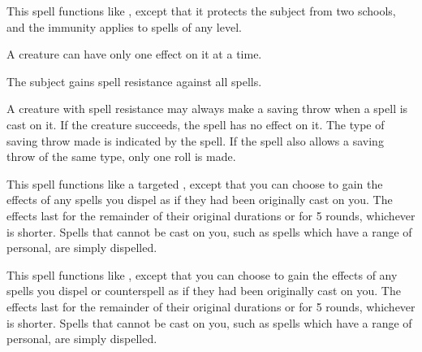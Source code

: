 \begin{spelleffect}
  This spell functions like , except that it protects the subject from two schools, and the immunity applies to spells of any level.
\end{spelleffect}
\begin{spellnotes}
  A creature can have only one  effect on it at a time.
\end{spellnotes}

\spellrng{\rngclose}
\spelldur{\durshort}
\begin{spelleffect}
  The subject gains spell resistance against all spells.
\end{spelleffect}
\begin{spellnotes}
  A creature with spell resistance may always make a saving throw when a spell is cast on it. If the creature succeeds, the spell has no effect on it. The type of saving throw made is indicated by the spell. If the spell also allows a saving throw of the same type, only one roll is made.
\end{spellnotes}

\begin{spelleffect}
  This spell functions like a targeted , except that you can choose to gain the effects of any spells you dispel as if they had been originally cast on you. The effects last for the remainder of their original durations or for 5 rounds, whichever is shorter. Spells that cannot be cast on you, such as spells which have a range of personal, are simply dispelled.
\end{spelleffect}

\begin{spelleffect}
  This spell functions like , except that you can choose to gain the effects of any spells you dispel or counterspell as if they had been originally cast on you. The effects last for the remainder of their original durations or for 5 rounds, whichever is shorter. Spells that cannot be cast on you, such as spells which have a range of personal, are simply dispelled.
\end{spelleffect}

